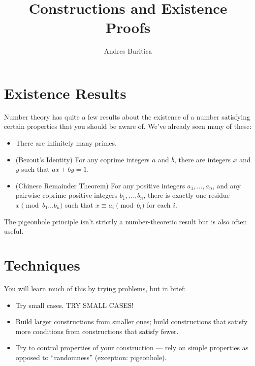\documentclass{article}
\title{Constructions and Existence Proofs}
\author{Andres Buritica}
\date{}
\begin{document}
\maketitle
\section{Existence Results}
Number theory has quite a few results about the existence of a number satisfying
certain properties that you should be aware of. We've already seen many of
these:
\begin{itemize}
  \item There are infinitely many primes.
  \item (Bezout's Identity)
    For any coprime integers $a$ and $b$, there are integers $x$ and $y$ such
    that $ax+by=1$.
  \item (Chinese Remainder Theorem)
    For any positive integers $a_1,\ldots,a_n$, and any pairwise coprime positive
    integers $b_1,\ldots,b_n$, there is exactly one residue $x\pmod {b_1\ldots
    b_n}$ such that $x\equiv a_i\pmod{b_i}$ for each $i$.
\end{itemize}
The pigeonhole principle isn't strictly a number-theoretic result but is also
often useful. 
\section{Techniques}
You will learn much of this by trying problems, but in brief:
\begin{itemize}
  \item Try small cases. TRY SMALL CASES!\@
  \item Build larger constructions from smaller ones; build constructions that
    satisfy more conditions from constructions that satisfy fewer.
  \item Try to control properties of your construction --- rely on simple
    properties as opposed to ``randomness'' (exception: pigeonhole).
\end{itemize}
\newpage
\end{document}
